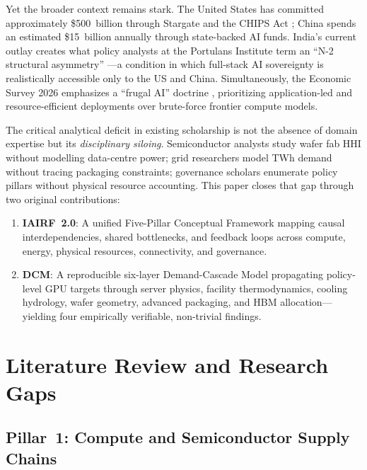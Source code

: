 \documentclass[conference]{IEEEtran}
\begin{document}
Yet the broader context remains stark. The United States has committed approximately \$500~billion through Stargate and the CHIPS Act \cite{whitehouse2023icet}; China spends an estimated \$15~billion annually through state-backed AI funds. India's current outlay creates what policy analysts at the Portulans Institute term an ``N-2 structural asymmetry'' \cite{portulans2026sovereignty}---a condition in which full-stack AI sovereignty is realistically accessible only to the US and China. Simultaneously, the Economic Survey 2026 emphasizes a ``frugal AI'' doctrine \cite{ceew2026datacentre}, prioritizing application-led and resource-efficient deployments over brute-force frontier compute models.

The critical analytical deficit in existing scholarship is not the absence of domain expertise but its \textit{disciplinary siloing}. Semiconductor analysts study wafer fab HHI without modelling data-centre power; grid researchers model TWh demand without tracing packaging constraints; governance scholars enumerate policy pillars without physical resource accounting. This paper closes that gap through two original contributions:

\begin{enumerate}[leftmargin=*, label=\textbf{C\arabic*.}]
  \item \textbf{IAIRF~2.0}: A unified Five-Pillar Conceptual Framework mapping causal interdependencies, shared bottlenecks, and feedback loops across compute, energy, physical resources, connectivity, and governance.
  \item \textbf{DCM}: A reproducible six-layer Demand-Cascade Model propagating policy-level GPU targets through server physics, facility thermodynamics, cooling hydrology, wafer geometry, advanced packaging, and HBM allocation---yielding four empirically verifiable, non-trivial findings.
\end{enumerate}

\section{Literature Review and Research Gaps}

\subsection{Pillar~1: Compute and Semiconductor Supply Chains}
\end{document}
